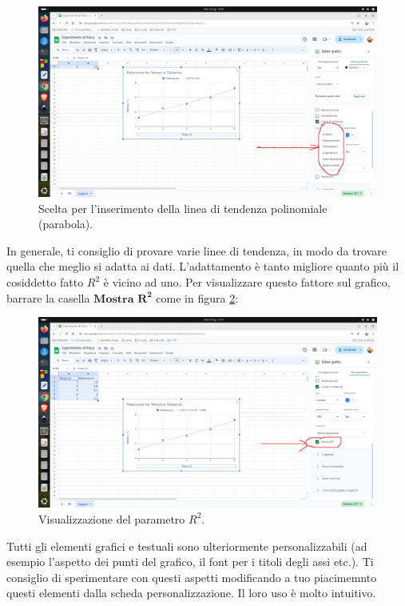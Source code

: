 \documentclass[12pt,a4paper,oneside]{book}
\theoremstyle{esercizio}
\begin{document}
\begin{enumerate}
\begin{figure}[h!]
    \centering
    \includegraphics[width=\linewidth]{path_to_image/polinomiale.png} 
    \caption{Scelta per l'inserimento della linea di tendenza polinomiale (parabola).}
    \label{fig:polinomiale}
\end{figure}     
 In generale, ti consiglio di provare varie linee di tendenza, in modo da trovare quella che meglio si adatta ai dati.    L'adattamento è tanto migliore quanto più il cosiddetto fatto $R^2$ è vicino ad uno. Per visualizzare questo fattore sul grafico, barrare la casella $\mathbf{Mostra \,\,R^2}$ come in figura \ref{fig:r2}:
 
   \begin{figure}[h!]
    \centering
    \includegraphics[width=\linewidth]{path_to_image/r2.png} 
    \caption{Visualizzazione del parametro $R^2$.}
    \label{fig:r2}
 \end{figure}
 
    
\end{enumerate}
Tutti gli elementi grafici e  testuali sono ulteriormente personalizzabili (ad esempio l'aspetto dei punti del grafico, il font per i titoli degli assi etc.). Ti consiglio di sperimentare con questi aspetti modificando a tuo piacimemnto questi elementi dalla scheda personalizzazione. Il loro uso è molto intuitivo.
\end{document}
